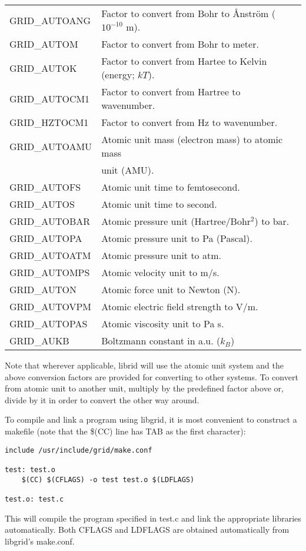 \documentclass[12pt,letterpaper]{report}
\begin{document}
\begin{longtable}{ll}
GRID\_AUTOANG & Factor to convert from Bohr to \AA{}nstr\"om ($10^{-10}$ m).\\
GRID\_AUTOM & Factor to convert from Bohr to meter.\\
GRID\_AUTOK & Factor to convert from Hartee to Kelvin (energy; $kT$).\\
GRID\_AUTOCM1 & Factor to convert from Hartree to wavenumber.\\
GRID\_HZTOCM1 & Factor to convert from Hz to wavenumber.\\
GRID\_AUTOAMU & Atomic unit mass (electron mass) to atomic mass\\
              & unit (AMU).\\
GRID\_AUTOFS & Atomic unit time to femtosecond.\\
GRID\_AUTOS  & Atomic unit time to second.\\
GRID\_AUTOBAR & Atomic pressure unit (Hartree/Bohr$^2$) to bar.\\
GRID\_AUTOPA & Atomic pressure unit to Pa (Pascal).\\
GRID\_AUTOATM & Atomic pressure unit to atm.\\
GRID\_AUTOMPS & Atomic velocity unit to m/s.\\
GRID\_AUTON & Atomic force unit to Newton (N).\\
GRID\_AUTOVPM & Atomic electric field strength to V/m.\\
GRID\_AUTOPAS & Atomic viscosity unit to Pa s.\\
GRID\_AUKB & Boltzmann constant in a.u. ($k_B$)\\ 
\end{longtable}
\noindent
Note that wherever applicable, librid will use the atomic unit system and the above conversion factors are provided for converting to other systems. To convert from atomic unit to another unit, multiply by the predefined factor above or, divide by it in order to convert the other way around.

To compile and link a program using libgrid, it is most convenient to construct a makefile (note that the \$(CC) line has TAB as the first character):
\begin{verbatim}
include /usr/include/grid/make.conf

test: test.o
    $(CC) $(CFLAGS) -o test test.o $(LDFLAGS)

test.o: test.c
\end{verbatim}
This will compile the program specified in test.c and link the appropriate libraries automatically. Both CFLAGS and LDFLAGS are obtained automatically from libgrid's make.conf. 
\end{document}
